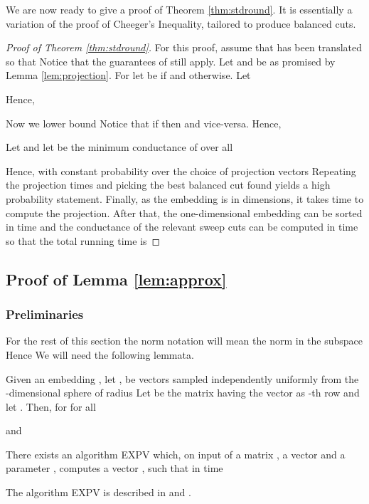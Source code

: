 \documentclass[twoside,leqno,twocolumn]{article}
\numberwithin{equation}{section}
\begin{document}
We are now ready to give a proof of Theorem \ref{thm:stdround}. It is essentially a variation of the proof of Cheeger's Inequality, tailored to produce balanced cuts.





\begin{proof}[Proof of Theorem \ref{thm:stdround}]
For this proof, assume that  has been translated so that  Notice that the guarantees of  still apply.
Let  and  be as promised by Lemma \ref{lem:projection}. 
For  let  be  if  and  otherwise.
Let 

 Hence,

Now we lower bound  Notice that if  then  and vice-versa. Hence, 

Let   and let  be the minimum conductance of  over all    

Hence,  with constant probability over the choice of projection vectors  Repeating the projection  times and picking the best balanced cut found yields a high probability statement. 
Finally, as the embedding is in  dimensions, it takes  time to compute the projection. After that, the one-dimensional embedding can be sorted in time  and the conductance of the relevant sweep cuts can be computed in time  so that the total running time is 
\end{proof}

\subsection{Proof of Lemma \ref{lem:approx}}\label{app:exp}


\subsubsection{Preliminaries}
For the rest of this section the norm notation will mean the norm in the subspace  Hence 
We will need the following lemmata.

\begin{lemma}\label{lem:jl}
Given an embedding ,  let , be vectors sampled independently uniformly from the -dimensional sphere of radius  Let  be the  matrix having the vector  as -th row and let . Then, for  for all  

and

\end{lemma}

\begin{lemma}\label{lem:expv} 
There exists an algorithm {\sf EXPV} which, on input of a matrix , a vector  and a parameter , computes a vector , such that  in time 
\end{lemma}
\noindent
The algorithm {\sf EXPV} is described in \cite{Kthesis} and \cite{YPS} .
\end{document}
